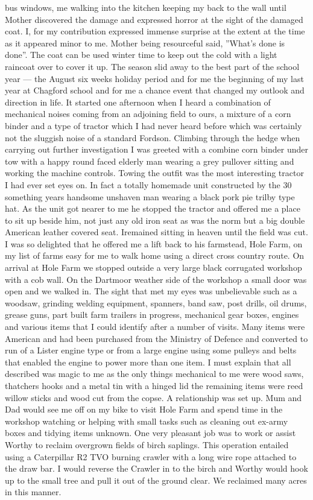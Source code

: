 bus windows, me walking into the kitchen keeping my back to the wall until
Mother discovered the damage and expressed horror at the sight of the damaged
coat.  I, for my contribution expressed immense surprise at the extent at the
time as it appeared minor to me.  Mother being resourceful said, ''What's done
is done''.  The coat can be used winter time to keep out the cold with a light
raincoat over to cover it up.  The season slid away to the best part of the
school year --- the August six weeks holiday period and for me the beginning of
my last year at Chagford school and for me a chance event that changed my
outlook and direction in life.  It started one afternoon when I heard a
combination of mechanical noises coming from an adjoining field to ours, a
mixture of a corn binder and a type of tractor which I had never heard before
which was certainly not the sluggish noise of a standard Fordson.  Climbing
through the hedge when carrying out further investigation I was greeted with a
combine corn binder under tow with a happy round faced elderly man wearing a
grey pullover sitting and working the machine controls.  Towing the outfit was
the most interesting tractor I had ever set eyes on.  In fact a totally
homemade unit constructed by the 30 something years handsome unshaven man
wearing a black pork pie trilby type hat.  As the unit got nearer to me he
stopped the tractor and offered me a place to sit up beside him, not just any
old iron seat as was the norm but a big double American leather covered seat.
Iremained sitting in heaven until the field was cut.  I was so delighted that
he offered me a lift back to his farmstead, Hole Farm, on my list of farms easy
for me to walk home using a direct cross country route.  On arrival at Hole
Farm we stopped outside a very large black corrugated workshop with a cob wall.
On the Dartmoor weather side of the workshop a small door was open and we
walked in. The sight that met my eyes was unbelievable such as a woodsaw,
grinding welding equipment, spanners, band saw, post drills, oil drums, grease
guns, part built farm trailers in progress, mechanical gear boxes, engines and
various items that I could identify after a number of visits.  Many items were
American and had been purchased from the Ministry of Defence and converted to
run of a Lister engine type or from a large engine using some pulleys and belts
that enabled the engine to power more than one item.  I must explain that all
described was magic to me as the only things  mechanical to me were wood saws,
thatchers hooks and a metal tin with a hinged lid the remaining items were reed
willow sticks and wood cut from the copse. A relationship was set up.  Mum and
Dad would see me off on my bike to visit Hole Farm and spend time in the
workshop watching or helping with small tasks such as cleaning out ex-army
boxes and tidying items unknown.  One very pleasant job was to work or assist
Worthy to reclaim overgrown fields of birch saplings.  This operation entailed
using a Caterpillar R2 TVO burning crawler with a long wire rope attached to
the draw bar.  I would reverse the Crawler in to the birch and Worthy would
hook up to the small tree and pull it out of the ground clear.  We reclaimed
many acres in this manner.
